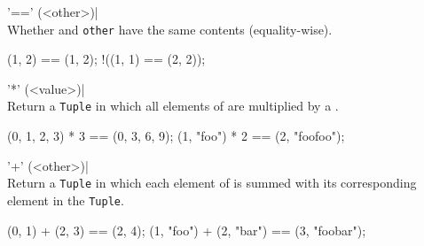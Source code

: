 \begin{urbiscriptapi}
\item['=='](<other>)|\\
  Whether \this and \lstinline|other| have the same
  contents (equality-wise).
\begin{urbiassert}
  (1, 2) == (1, 2);
!((1, 1) == (2, 2));
\end{urbiassert}

\item['*'](<value>)|\\
  Return a \lstinline|Tuple| in which all elements of \this are multiplied
  by a .

\begin{urbiassert}
(0, 1, 2, 3) * 3 == (0, 3, 6, 9);
(1, "foo") * 2 == (2, "foofoo");
\end{urbiassert}

\item['+'](<other>)|\\
  Return a \lstinline|Tuple| in which each element of \this is summed with
  its corresponding element in the  \lstinline|Tuple|.

\begin{urbiassert}
(0, 1) + (2, 3) == (2, 4);
(1, "foo") + (2, "bar") == (3, "foobar");
\end{urbiassert}


\end{urbiscriptapi}



